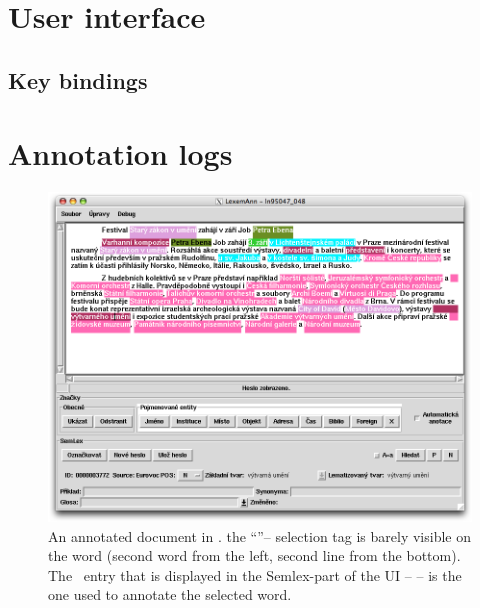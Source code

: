 \section{User interface}
\label{sec:seman:gui}


\subsection{Key bindings}


\section{Annotation logs}
\label{sec:logs}


\begin{figure}[htbp]
   \centering
   \includegraphics[scale=.4]{images/sem-ann.png} 
   \caption{An annotated document in \seman. the ``''-- selection tag is barely visible on the word  (second word from the left, second line from the bottom). The \semlex\ entry that is displayed in the Semlex-part of the UI --  -- is the one used to annotate the selected word. }
   \label{fig:example}
\end{figure}